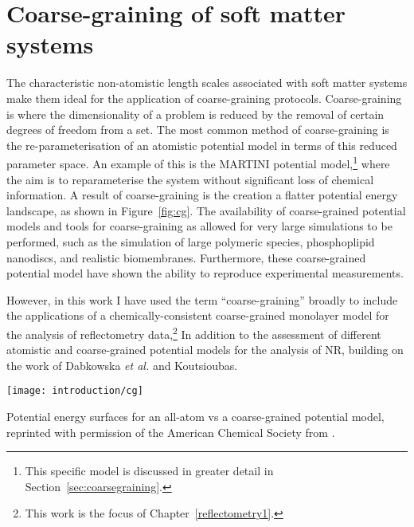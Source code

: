 \section{Coarse-graining of soft matter systems}
The characteristic non-atomistic length scales associated with soft matter systems make them ideal for the application of coarse-graining protocols.
Coarse-graining is where the dimensionality of a problem is reduced by the removal of certain degrees of freedom from a set.
The most common method of coarse-graining is the re-parameterisation of an atomistic potential model in terms of this reduced parameter space.
An example of this is the MARTINI potential model,\footnote{This specific model is discussed in greater detail in Section~\ref{sec:coarsegraining}.} where the aim is to reparameterise the system without significant loss of chemical information.\autocite{marrink_martini_2007}
A result of coarse-graining is the creation a flatter potential energy landscape, as shown in Figure~\ref{fig:cg}.
The availability of coarse-grained potential models and tools for coarse-graining as allowed for very large simulations to be performed, such as the simulation of large polymeric species,\autocite{carbone_transferability_2008} phosphoplipid nanodiscs,\autocite{xue_molecular_2018} and realistic biomembranes.\autocite{marrink_computational_2019}
Furthermore, these coarse-grained potential model have shown the ability to reproduce experimental measurements.\autocite{negro_experimental_2014,nawaz_interactions_2012}

However, in this work I have used the term ``coarse-graining'' broadly to include the applications of a chemically-consistent coarse-grained monolayer model for the analysis of reflectometry data,\footnote{This work is the focus of Chapter~\ref{reflectometry1}.}
In addition to the assessment of different atomistic and coarse-grained potential models for the analysis of NR, building on the work of Dabkowska \emph{et al.} and Koutsioubas.\autocite[][see Chapter~\ref{reflectometry2}]{dabkowska_modulation_2014,koutsioubas_combined_2016}
%
\begin{marginfigure}
    \texttt{[image: introduction/cg]}
    \caption{Potential energy surfaces for an all-atom vs a coarse-grained potential model, reprinted with permission of the American Chemical Society from \cite{kmiecik_coarse-grained_2016}.}
    \label{fig:cg}
\end{marginfigure}
%
